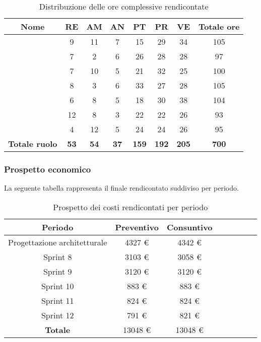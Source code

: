 \begin{table}[H]
		\begin{center}
			\setlength{\aboverulesep}{0pt}
			\setlength{\belowrulesep}{0pt}
			\setlength{\extrarowheight}{.75ex}
			\begin{tabular}{ c c c c c c c c }
				\rowcolor{AzzurroGruppo!30} 
				\textbf{Nome} & \textbf{RE} & \textbf{AM} & \textbf{AN} & \textbf{PT} & \textbf{PR} & \textbf{VE} & \textbf{Totale ore}\\
				\toprule
				\Davide{}    & 9 & 11 & 7 & 15 & 29 & 34 & 105 \\
				\Giosue{}    & 7 & 2 & 6 & 26 & 28 & 28 & 97\\
				\Francesco{} & 7 & 10 & 5 & 21 & 32 & 25 & 100\\
				\Daniele{}   & 8 & 3 & 6 & 33 & 27 & 28 & 105\\
				\Lucrezia{}  & 6 & 8 & 5 & 18 & 30 & 38 & 104\\
				\Matteo{}   & 12 & 8 & 3 & 22 & 22 & 26 & 93\\
				\Tommaso{}   & 4 & 12 & 5 & 24 & 24 & 26 & 95\\
				\textbf{Totale ruolo} & \textbf{53} & \textbf{54} & \textbf{37} & \textbf{159} & \textbf{192} & \textbf{205} & \textbf{700} \\
				\bottomrule
			\end{tabular}
			\caption{Distribuzione delle ore complessive rendicontate}
		\end{center}
	\end{table}
	
\subsubsection{Prospetto economico}
La seguente tabella rappresenta il finale rendicontato suddiviso per periodo.
\begin{table}[H]
		\begin{center}
			\setlength{\aboverulesep}{0pt}
			\setlength{\belowrulesep}{0pt}
			\setlength{\extrarowheight}{.75ex}
			\begin{tabular}{ c c c c c c c c }
				\rowcolor{AzzurroGruppo!30} 
				\textbf{Periodo} & \textbf{Preventivo} & \textbf{Consuntivo}\\
				\toprule
				Progettazione architetturale & 4327 \euro{} & 4342 \euro{} \\
				Sprint 8  & 3103 \euro{} & 3058 \euro{} \\
				Sprint 9  & 3120 \euro{} & 3120 \euro{} \\
				Sprint 10 & 883 \euro{} & 883 \euro{} \\
				Sprint 11 & 824 \euro{} & 824 \euro{} \\
				Sprint 12 & 791 \euro{} & 821 \euro{} \\
				\textbf{Totale} & 13048 \euro{} & 13048 \euro{} \\
				\bottomrule
			\end{tabular}
			\caption{Prospetto dei costi rendicontati per periodo}
		\end{center}
	\end{table}

